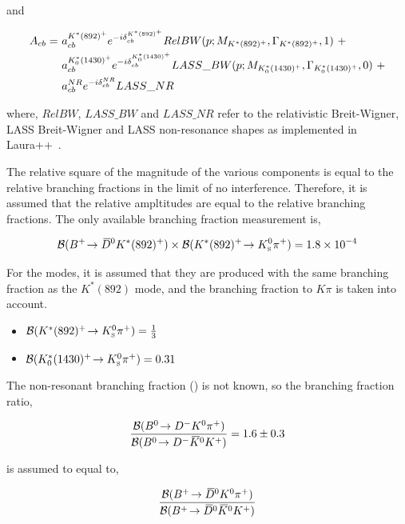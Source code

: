 and

\begin{align*}
A_{\cquark\bquark} =\ & a_{\cquark\bquark}^{K^*(892)^+}e^{-i\delta_{\cquark\bquark}^{K^*(892)^+}}RelBW(p;M_{K^*(892)^+},\Gamma_{K^*(892)^+},1)\ + \\
& a_{\cquark\bquark}^{K^*_0(1430)^+}e^{-i\delta_{\cquark\bquark}^{K^*_0(1430)^+}}LASS\_BW(p;M_{K^*_0(1430)^+},\Gamma_{K^*_0(1430)^+},0)\ + \\
& a_{\cquark\bquark}^{NR}e^{-i\delta_{\cquark\bquark}^{NR}}LASS\_NR
\end{align*}

where, $RelBW$, $LASS\_BW$ and $LASS\_NR$ refer to the relativistic Breit-Wigner, LASS Breit-Wigner and LASS non-resonance shapes as implemented in Laura++~\cite{Laura}. 

The relative square of the magnitude of the various components is equal to the relative branching fractions in the limit of no interference. Therefore, it is assumed that the relative ampltitudes are equal to the relative branching fractions. The only available branching fraction measurement is,

\begin{equation*}
{\ensuremath{\mathcal{B}}}({{{B}^+}}\!\rightarrow {\ensuremath{{\kern 0.2em\overline{\kern -0.2em D}{}}{}^0}} K^*(892)^+) \times {\ensuremath{\mathcal{B}}}(K^*(892)^+\!\rightarrow {\ensuremath{{K}^0_{\mathrm{ \scriptscriptstyle S}}}}{\ensuremath{{\pi}^+}}) = 1.8 \times 10^{-4}
\end{equation*}

For the \Kstar modes, it is assumed that they are produced with the same branching fraction as the $K^*(892)$ mode, and the branching fraction to $K\pi$ is taken into account.

\begin{itemize}
\item ${\mathcal{B}}(K^*(892)^+\!\rightarrow {\ensuremath{{K}^0_{\mathrm{ \scriptscriptstyle S}}}}{\ensuremath{{\pi}^+}}) = \frac{1}{3}$
\item ${\mathcal{B}}(K^*_0(1430)^+\!\rightarrow {\ensuremath{{K}^0_{\mathrm{ \scriptscriptstyle S}}}}{\ensuremath{{\pi}^+}}) = 0.31$
\end{itemize}

The non-resonant branching fraction \BR(\decay{\Bp}{\Dzb\KS\pip}) is not known, so the branching fraction ratio,

\begin{equation*}
\frac{{\mathcal{B}}({{B}^0}\!\rightarrow {\ensuremath{{D}^-}}{\ensuremath{{K}^0}}{\ensuremath{{\pi}^+}})}{{\mathcal{B}}({{B}^0}\!\rightarrow {\ensuremath{{D}^-}}{\ensuremath{{\kern 0.2em\overline{\kern -0.2em K}{}}{}^0}}{\ensuremath{{K}^+}})} = 1.6 \pm 0.3
\end{equation*}

is assumed to equal to,

\begin{equation*}
\frac{{\mathcal{B}}({{{B}^+}}\!\rightarrow {\ensuremath{{\kern 0.2em\overline{\kern -0.2em D}{}}{}^0}}{\ensuremath{{K}^0}}{\ensuremath{{\pi}^+}})}{{\mathcal{B}}({{{B}^+}}\!\rightarrow {\ensuremath{{\kern 0.2em\overline{\kern -0.2em D}{}}{}^0}}{\ensuremath{{\kern 0.2em\overline{\kern -0.2em K}{}}{}^0}}{\ensuremath{{K}^+}})}
\end{equation*}

